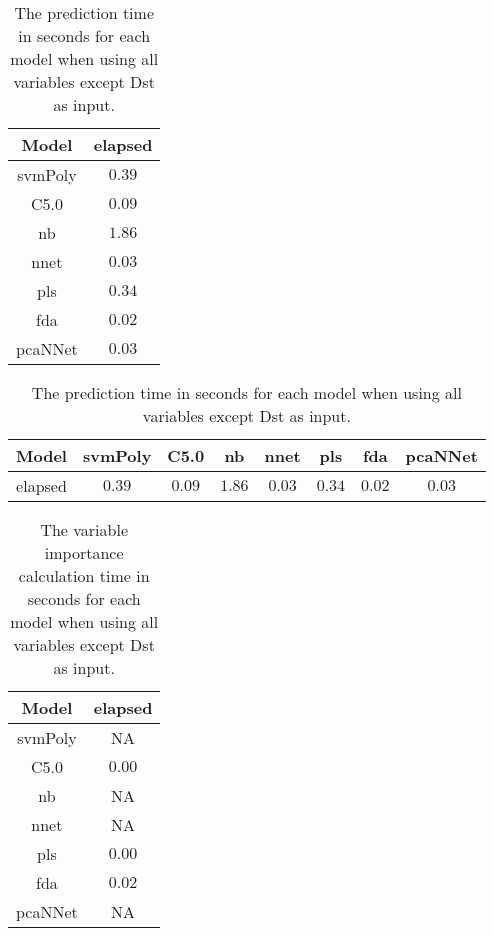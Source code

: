 \begin{table}[!ht]
	\centering
	\begin{tabular}{|c|c|}
		\hline
		Model & elapsed \\ \hline
		svmPoly & $0.39$ \\ \hline
		C5.0 & $0.09$ \\ \hline
		nb & $1.86$ \\ \hline
		nnet & $0.03$ \\ \hline
		pls & $0.34$ \\ \hline
		fda & $0.02$ \\ \hline
		pcaNNet & $0.03$ \\ \hline
	\end{tabular}
	\caption{The prediction time in seconds for each model when using all variables except Dst as input.}
	\label{tab:time:noDst:predict}
\end{table}

\begin{table}[!ht]
	\centering
	\begin{tabular}{|c|c|c|c|c|c|c|c|}
		\hline
		Model & svmPoly & C5.0 & nb & nnet & pls & fda & pcaNNet \\ \hline
		elapsed & $0.39$ & $0.09$ & $1.86$ & $0.03$ & $0.34$ & $0.02$ & $0.03$ \\ \hline
	\end{tabular}
	\caption{The prediction time in seconds for each model when using all variables except Dst as input.}
	\label{tab:time:reverse:noDst:predict}
\end{table}

\begin{table}[!ht]
	\centering
	\begin{tabular}{|c|c|}
		\hline
		Model & elapsed \\ \hline
		svmPoly & NA \\ \hline
		C5.0 & $0.00$ \\ \hline
		nb & NA \\ \hline
		nnet & NA \\ \hline
		pls & $0.00$ \\ \hline
		fda & $0.02$ \\ \hline
		pcaNNet & NA \\ \hline
	\end{tabular}
	\caption{The variable importance calculation time in seconds for each model when using all variables except Dst as input.}
	\label{tab:time:noDst:importance}
\end{table}

